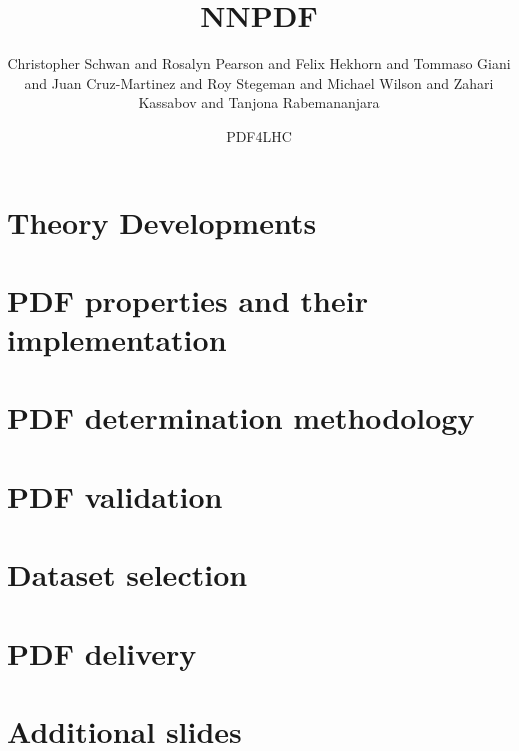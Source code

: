 \documentclass[xcolor={usenames,svgnames}]{beamer}
\author[NNPDF \& N3PDF]{
Christopher Schwan and
Rosalyn Pearson and
Felix Hekhorn and
Tommaso Giani and
Juan Cruz-Martinez and
Roy Stegeman and
Michael Wilson and
Zahari Kassabov and
Tanjona Rabemananjara
}
\title{NNPDF}
\date{PDF4LHC}
\author[\genericauthor]{} %
\institute{} %
\begin{document}
\section{Theory Developments}



\section{PDF properties and their implementation}



\section{PDF determination methodology}



\section{PDF validation}



\section{Dataset selection}


\section{PDF delivery}


\section{Additional slides}





\end{document}
